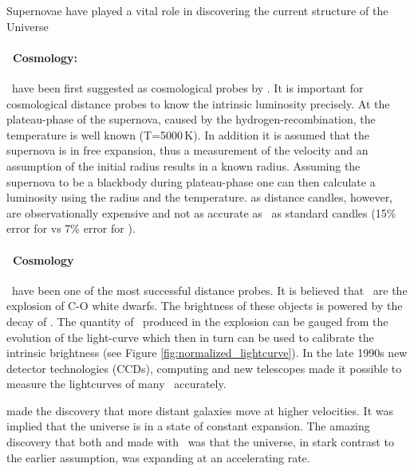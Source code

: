 Supernovae have played a vital role in discovering the current structure of the Universe

\paragraph{\snii\ Cosmology:}
\sniip\ have been first suggested as cosmological probes by \citet{1974ApJ...193...27K}. It is important for cosmological distance probes to know the intrinsic luminosity precisely. At the plateau-phase of the supernova, caused by the hydrogen-recombination,  the temperature is well known (T=5000\,K). In addition it is assumed that the supernova is in free expansion, thus a measurement of the velocity and an assumption of the initial radius results in a known radius. Assuming the supernova to be a blackbody during plateau-phase one can then calculate a luminosity using the radius and the temperature. \sniip as distance candles, however, are observationally expensive and not as accurate as \snia\ as standard candles (15\% error for \snii  \citep{2006ApJ...645..841N} vs 7\% error for \snia).

\paragraph{\snia\ Cosmology}
\sneia\ have been one of the most successful distance probes. It is believed that \sneia\ are the explosion of C-O white dwarfs. The brightness of these objects is powered by the decay of \Ni. The quantity of \Ni\ produced in the explosion can be gauged from the evolution of the light-curve which then in turn can be used to calibrate the intrinsic brightness (see Figure \ref{fig:normalized_lightcurve}).
In the late 1990s new detector technologies (CCDs), computing and new telescopes made it possible to measure the lightcurves of many \sneia\ accurately. 

\citet{1929PNAS...15..168H} made the discovery that more distant galaxies move at higher velocities. It was implied that the universe is in a state of constant expansion. The amazing discovery that both \citet{1998AJ....116.1009R} and \citet{1999ApJ...517..565P} made with \sneia\ was that the universe, in stark contrast to the earlier assumption, was expanding at an accelerating rate. 

